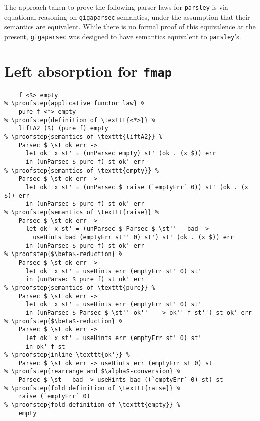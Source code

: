 \documentclass[../../main.tex]{subfiles}
\begin{document}
 \label{appendix:parser-law-proofs}

The approach taken to prove the following parser laws for \texttt{parsley} is via equational reasoning on \texttt{gigaparsec} semantics, under the assumption that their semantics are equivalent.
While there is no formal proof of this equivalence at the present, \texttt{gigaparsec} was designed to have semantics equivalent to \texttt{parsley}'s.

\section{Left absorption for \texttt{fmap}}
\begin{lstlisting}
    f <$> empty
% \proofstep{applicative functor law} %
    pure f <*> empty
% \proofstep{definition of \texttt{<*>}} %
    liftA2 ($) (pure f) empty
% \proofstep{semantics of \texttt{liftA2}} %
    Parsec $ \st ok err ->
      let ok' x st' = (unParsec empty) st' (ok . (x $)) err
      in (unParsec $ pure f) st ok' err
% \proofstep{semantics of \texttt{empty}} %
    Parsec $ \st ok err ->
      let ok' x st' = (unParsec $ raise (`emptyErr` 0)) st' (ok . (x $)) err
      in (unParsec $ pure f) st ok' err
% \proofstep{semantics of \texttt{raise}} %
    Parsec $ \st ok err ->
      let ok' x st' = (unParsec $ Parsec $ \st'' _ bad ->
        useHints bad (emptyErr st'' 0) st') st' (ok . (x $)) err
      in (unParsec $ pure f) st ok' err
% \proofstep{$\beta$-reduction} %
    Parsec $ \st ok err ->
      let ok' x st' = useHints err (emptyErr st' 0) st'
      in (unParsec $ pure f) st ok' err
% \proofstep{semantics of \texttt{pure}} %
    Parsec $ \st ok err ->
      let ok' x st' = useHints err (emptyErr st' 0) st'
      in (unParsec $ Parsec $ \st'' ok'' _ -> ok'' f st'') st ok' err
% \proofstep{$\beta$-reduction} %
    Parsec $ \st ok err ->
      let ok' x st' = useHints err (emptyErr st' 0) st'
      in ok' f st
% \proofstep{inline \texttt{ok'}} %
    Parsec $ \st ok err -> useHints err (emptyErr st 0) st
% \proofstep{rearrange and $\alpha$-conversion} %
    Parsec $ \st _ bad -> useHints bad ((`emptyErr` 0) st) st
% \proofstep{fold definition of \texttt{raise}} %
    raise (`emptyErr` 0)
% \proofstep{fold definition of \texttt{empty}} %
    empty
\end{lstlisting}
\end{document}
